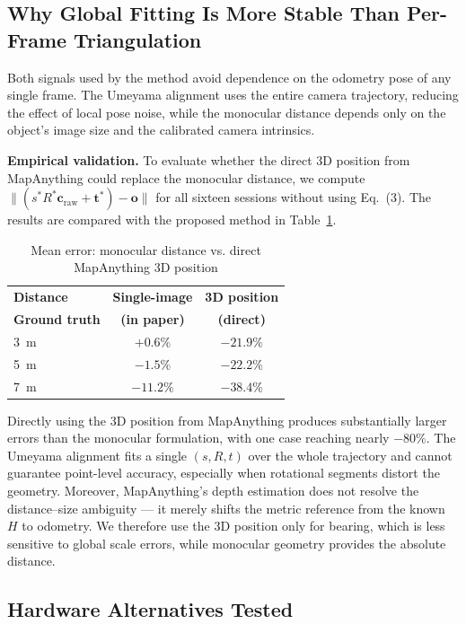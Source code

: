 \documentclass[conference]{IEEEtran}
\begin{document}
\subsection{Why Global Fitting Is More Stable Than Per-Frame Triangulation}
\label{sec:global-fit-stable}

Both signals used by the method avoid dependence on the odometry pose of any single frame. The Umeyama alignment uses the entire camera trajectory, reducing the effect of local pose noise, while the monocular distance depends only on the object's image size and the calibrated camera intrinsics.

\textbf{Empirical validation.} To evaluate whether the direct 3D position from MapAnything could replace the monocular distance, we compute $\lVert (s^*R^*\mathbf{c}_{\text{raw}}+\mathbf{t}^*)-\mathbf{o}\rVert$ for all sixteen sessions without using Eq.~(3). The results are compared with the proposed method in Table~\ref{tab:3d-vs-mono}.


\begin{table}[t]
\centering
\small
\caption{Mean error: monocular distance vs. direct MapAnything 3D position}
\label{tab:3d-vs-mono}
\begin{tabular}{@{}lcc@{}}
\toprule
\textbf{Distance} & \textbf{Single-image} & \textbf{3D position} \\
\textbf{Ground truth} & \textbf{(in paper)} & \textbf{(direct)} \\
\midrule
\SI{3}{\meter} & $+0.6\%$ & $-21.9\%$ \\
\SI{5}{\meter} & $-1.5\%$ & $-22.2\%$ \\
\SI{7}{\meter} & $-11.2\%$ & $-38.4\%$ \\
\bottomrule
\end{tabular}
\end{table}

Directly using the 3D position from MapAnything produces substantially larger errors than the monocular formulation, with one case reaching nearly $-80\%$. The Umeyama alignment fits a single $(s,R,t)$ over the whole trajectory and cannot guarantee point-level accuracy, especially when rotational segments distort the geometry. Moreover, MapAnything's depth estimation does not resolve the distance--size ambiguity — it merely shifts the metric reference from the known $H$ to odometry. We therefore use the 3D position only for bearing, which is less sensitive to global scale errors, while monocular geometry provides the absolute distance.

\subsection{Hardware Alternatives Tested}
\label{sec:hw-alternatives}
\end{document}

